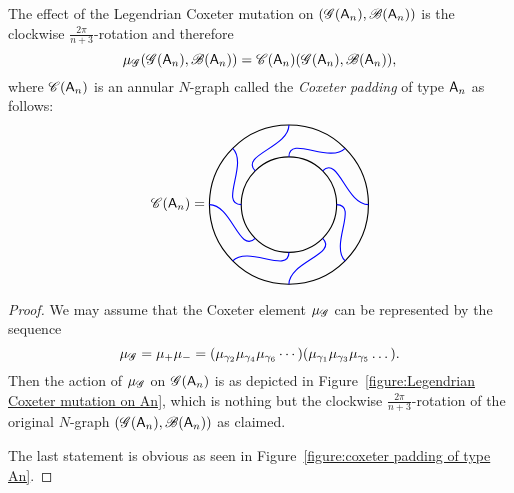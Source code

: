 \begin{lemma}\label{lemma:Legendriam Coxeter mutation of type An}
The effect of the Legendrian Coxeter mutation on $(\mathscr{G}(\mathsf{A}_n),\mathscr{B}(\mathsf{A}_n))$ is the clockwise $\frac{2\pi}{n+3}$-rotation and therefore
\[
\mu_\mathscr{G}(\mathscr{G}(\mathsf{A}_n),\mathscr{B}(\mathsf{A}_n))=
\mathscr{C}(\mathsf{A}_n)(\mathscr{G}(\mathsf{A}_n),\mathscr{B}(\mathsf{A}_n)),
\]
where $\mathscr{C}(\mathsf{A}_n)$ is an annular $N$-graph called the \emph{Coxeter padding} of type $\mathsf{A}_n$ as follows:
\begin{equation}\label{equation:Coxeter padding of type An}
\coxeterpadding(\dynA_n)=
\begin{tikzpicture}[baseline=-.5ex,scale=0.4]
\draw[thick] (0,0) circle (5) (0,0) circle (3);
\foreach \i in {45, 90, ..., 360} {
\draw[blue, thick] (\i:5) to[out=\i-180,in=\i+45] (\i+45:3);
}
\end{tikzpicture}
\end{equation}
\end{lemma}
\begin{proof}
We may assume that the Coxeter element $\mu_\mathscr{G}$ can be represented by the sequence
\[
\mu_\mathscr{G}=\mu_+\mu_-=(\mu_{\gamma_2}\mu_{\gamma_4}\mu_{\gamma_6}\cdots)(\mu_{\gamma_1}\mu_{\gamma_3}\mu_{\gamma_5}\dots).
\]
Then the action of $\mu_\mathscr{G}$ on $\mathscr{G}(\mathsf{A}_n)$ is as depicted in Figure~\ref{figure:Legendrian Coxeter mutation on An}, which is nothing but the clockwise $\frac{2\pi}{n+3}$-rotation of the original $N$-graph $(\mathscr{G}(\mathsf{A}_n),\mathscr{B}(\mathsf{A}_n))$ as claimed.

The last statement is obvious as seen in Figure~\ref{figure:coxeter padding of type An}.
\end{proof}

